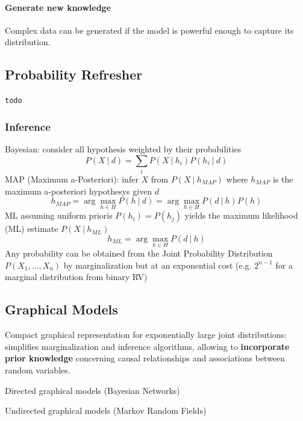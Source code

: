 \documentclass[10pt]{report}
\begin{document}
\paragraph{Generate new knowledge} Complex data can be generated if the model is powerful enough to capture its distribution.
\subsection{Probability Refresher}
\texttt{todo}
\subsubsection{Inference} Bayesian: consider all hypothesis weighted by their probabilities
$$P(X\:|\:d)=\sum_i P(X\:|\:h_i)P(h_i\:|\:d)$$
MAP (Maximum a-Posteriori): infer $X$ from $P(X\:|\:h_{MAP})$ where $h_{MAP}$ is the maximum a-posteriori hypothesys given $d$
$$h_{MAP} = \arg\max_{h\in H} P(h\:|\:d) = \arg\max_{h\in H} P(d\:|\:h)P(h)$$
ML assuming uniform prioris $P(h_i)=P(h_j)$ yields the maximum likelihood (ML) estimate $P(X\:|\:h_{ML})$ $$h_{ML} = \arg\max_{h\in H} P(d\:|\:h)$$
Any probability can be obtained from the Joint Probability Distribution $P(X_1,\ldots,X_n)$ by marginalization but at an exponential cost (e.g. $2^{n-1}$ for a marginal distribution from binary RV)
\subsection{Graphical Models}
Compact graphical representation for exponentially large joint distributions: simplifies marginalization and inference algorithms, allowing to \textbf{incorporate prior knowledge} concerning causal relationships and associations between random variables.\begin{list}{}{}
	\item Directed graphical models (Bayesian Networks)
	\item Undirected graphical models (Markov Random Fields)
\end{list}
\end{document}
